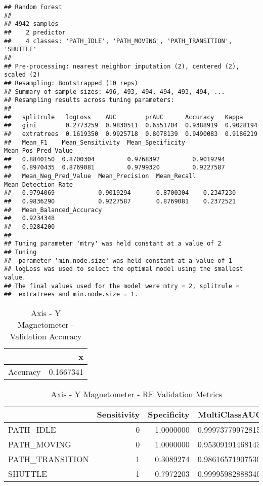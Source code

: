 \documentclass[]{article}
\begin{document}
\begin{verbatim}
## Random Forest 
## 
## 4942 samples
##    2 predictor
##    4 classes: 'PATH_IDLE', 'PATH_MOVING', 'PATH_TRANSITION', 'SHUTTLE' 
## 
## Pre-processing: nearest neighbor imputation (2), centered (2), scaled (2) 
## Resampling: Bootstrapped (10 reps) 
## Summary of sample sizes: 496, 493, 494, 494, 493, 494, ... 
## Resampling results across tuning parameters:
## 
##   splitrule   logLoss    AUC        prAUC      Accuracy   Kappa    
##   gini        0.2773259  0.9830511  0.6551704  0.9388919  0.9028194
##   extratrees  0.1619350  0.9925718  0.8078139  0.9490083  0.9186219
##   Mean_F1    Mean_Sensitivity  Mean_Specificity  Mean_Pos_Pred_Value
##   0.8840150  0.8700304         0.9768392         0.9019294          
##   0.8970435  0.8769081         0.9799320         0.9227587          
##   Mean_Neg_Pred_Value  Mean_Precision  Mean_Recall  Mean_Detection_Rate
##   0.9794069            0.9019294       0.8700304    0.2347230          
##   0.9836290            0.9227587       0.8769081    0.2372521          
##   Mean_Balanced_Accuracy
##   0.9234348             
##   0.9284200             
## 
## Tuning parameter 'mtry' was held constant at a value of 2
## Tuning
##  parameter 'min.node.size' was held constant at a value of 1
## logLoss was used to select the optimal model using the smallest value.
## The final values used for the model were mtry = 2, splitrule =
##  extratrees and min.node.size = 1.
\end{verbatim}

\begin{table}[!h]

\caption{\label{tab:sensor-y-mag-rf-results}Axis - Y Magnetometer - Validation Accuracy}
\centering
\begin{tabular}[t]{lr}
\toprule
  & x\\
\midrule
Accuracy & 0.1667341\\
\bottomrule
\end{tabular}
\end{table}

\begin{table}[!h]

\caption{\label{tab:sensor-y-mag-rf-results}Axis - Y Magnetometer - RF Validation Metrics}
\centering
\begin{tabular}[t]{lrrl}
\toprule
  & Sensitivity & Specificity & MultiClassAUC\\
\midrule
PATH\_IDLE & 0 & 1.0000000 & 0.99973779972815\\
PATH\_MOVING & 0 & 1.0000000 & 0.953091914681431\\
PATH\_TRANSITION & 1 & 0.3089274 & 0.986165719075302\\
SHUTTLE & 1 & 0.7972203 & 0.999959828883404\\
\bottomrule
\end{tabular}
\end{table}
\end{document}
